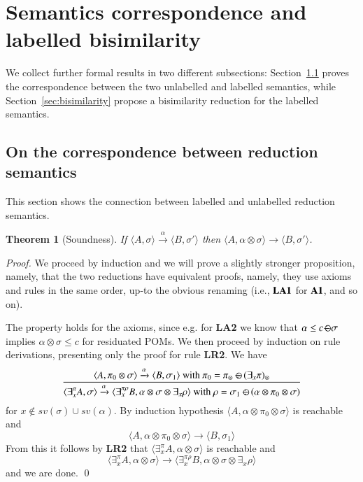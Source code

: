 \documentclass[preprint,12pt]{elsarticle}
\newtheorem{proof}{Proof}
\newtheorem{theorem}{Theorem}
\def\C{{\mathcal C}}
\def\C{{\mathcal C}}
\def\odiv{\, {\ominus\hspace{-7.7pt} \div} \,}
\begin{document}
\section{Semantics correspondence and labelled bisimilarity}\label{sec:correspondancebis}
We collect further formal results in two different subsections: Section~\ref{sec:corres} proves the correspondence between the two unlabelled and labelled semantics, while Section~\ref{sec:bisimilarity} propose a bisimilarity reduction for the labelled  semantics.

\subsection{On the correspondence between reduction semantics}
\label{sec:corres}
This section shows the connection between labelled and unlabelled reduction semantics.
%

\begin{theorem}[Soundness]
	\label{sound}
	If $\langle A, \sigma \rangle \xrightarrow{\alpha} \langle B, \sigma' \rangle$
	then %
	$\langle A, \alpha \otimes \sigma \rangle \to \langle B, \sigma' \rangle$.
\end{theorem}
\begin{proof}
	We proceed by induction and we will prove a slightly stronger proposition, namely, that the two reductions
	have equivalent proofs, namely, they use axioms and rules in the same order,
	up-to the obvious renaming (i.e., ${\bf LA1}$ for ${\bf A1}$, and so on).
	
	The property holds for the axioms, since e.g. for {\bf LA2} we know that
	$\alpha \leq c \odiv \sigma$ implies $\alpha \otimes \sigma \leq c$ for residuated POMs.
	We then proceed by induction on rule derivations,
	presenting only the proof for rule {\bf LR2}.
	We have 
	$$\frac {\displaystyle \langle A, \pi_0 \otimes \sigma \rangle \xrightarrow{\alpha}
		\langle B, \sigma_1 \rangle \text{ with } \pi_0 = \pi_\otimes \; {\ominus\hspace{-7.5pt} \div} \; (\exists_x \pi)_\otimes }
	{\displaystyle \langle \exists^\pi_x A, \sigma \rangle \xrightarrow{\alpha}
		\langle \exists^{\pi \rho}_x B, \alpha \otimes \sigma \otimes \exists_x \rho \rangle  \text{ with } \rho = \sigma_1 \; {\ominus\hspace{-7.5pt} \div} \; (\alpha \otimes \pi_0 \otimes \sigma)}$$
	for $x \not \in sv(\sigma) \cup sv(\alpha)$.
	By induction hypothesis $\langle A, \alpha \otimes \pi_0 \otimes \sigma \rangle$ is reachable and
	$$\langle A, \alpha \otimes \pi_0 \otimes \sigma \rangle \to
	\langle B, \sigma_1 \rangle$$
	From this it follows by {\bf LR2} that $\langle \exists^\pi_x A, \alpha \otimes \sigma \rangle$ is reachable and
	$$\langle \exists^\pi_x A, \alpha \otimes \sigma \rangle \to
	\langle \exists^{\pi \rho}_x B, \alpha \otimes \sigma \otimes \exists_x \rho \rangle$$
	and we are done.
	\qed
\end{proof}
\end{document}

